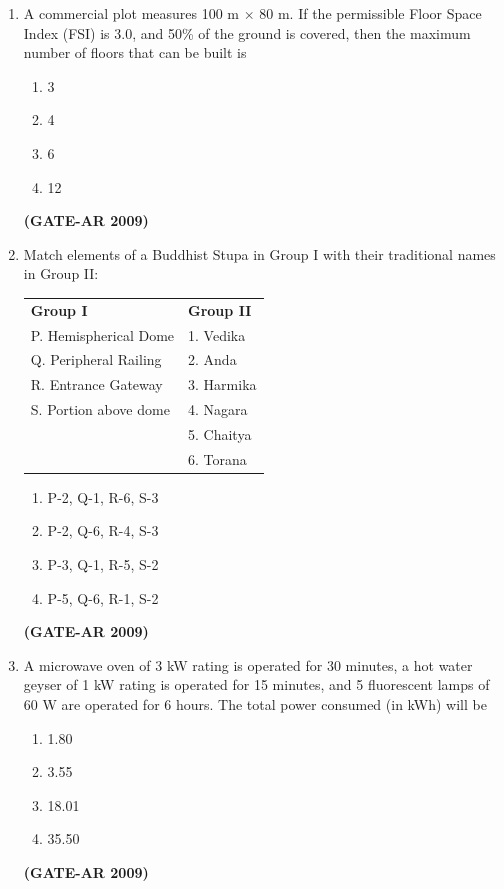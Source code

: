 \documentclass[a4paper,10pt]{article}
\begin{document}
\begin{enumerate}
    \item A commercial plot measures 100 m $\times$ 80 m. If the permissible Floor Space Index (FSI) is 3.0, and 50\% of the ground is covered, then the maximum number of floors that can be built is 
    \begin{multicols}{4}
	\begin{enumerate}
        \item 3
        \item 4
        \item 6
        \item 12
    \end{enumerate}
	\end{multicols}
    \hfill \textbf{(GATE-AR 2009)}

    \item Match elements of a Buddhist Stupa in Group I with their traditional names in Group II:  \\
	\begin{tabular}{ l l }
	\textbf{Group I} & \textbf{Group II} \\
	P. Hemispherical Dome & 1. Vedika \\
	Q. Peripheral Railing & 2. Anda \\
	R. Entrance Gateway & 3. Harmika \\
	S. Portion above dome & 4. Nagara \\
	& 5. Chaitya \\
	& 6. Torana \\
	\end{tabular}
	\begin{multicols}{2}
	\begin{enumerate}
        \item P-2, Q-1, R-6, S-3
        \item P-2, Q-6, R-4, S-3
        \item P-3, Q-1, R-5, S-2
        \item P-5, Q-6, R-1, S-2
    \end{enumerate}
	\end{multicols}
    \hfill \textbf{(GATE-AR 2009)}

    \item A microwave oven of 3 kW rating is operated for 30 minutes, a hot water geyser of 1 kW rating is operated for 15 minutes, and 5 fluorescent lamps of 60 W are operated for 6 hours. The total power consumed (in kWh) will be 
    \begin{multicols}{4}
	\begin{enumerate}
        \item 1.80
        \item 3.55
        \item 18.01
        \item 35.50
    \end{enumerate}
	\end{multicols}
    \hfill \textbf{(GATE-AR 2009)}


\end{enumerate}
\end{document}
